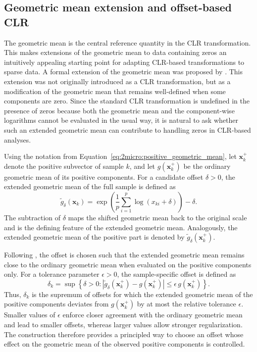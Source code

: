 \subsection{Geometric mean extension and offset-based CLR}
\label{sec:2micro:clr_with_zeros:gmeCLR}

The geometric mean is the central reference quantity in the CLR transformation. This makes extensions of the geometric mean to data containing zeros an intuitively appealing starting point for adapting CLR-based transformations to sparse data. A formal extension of the geometric mean was proposed by \citet{delacruz2019geometric}. This extension was not originally introduced as a CLR transformation, but as a modification of the geometric mean that remains well-defined when some components are zero. Since the standard CLR transformation is undefined in the presence of zeros because both the geometric mean and the component-wise logarithms cannot be evaluated in the usual way, it is natural to ask whether such an extended geometric mean can contribute to handling zeros in CLR-based analyses.

Using the notation from Equation~\eqref{eq:2micro:positive_geometric_mean}, let $\mathbf{x}_k^+$ denote the positive subvector of sample $k$, and let $g(\mathbf{x}_k^+)$ be the ordinary geometric mean of its positive components. For a candidate offset $\delta>0$, the extended geometric mean of the full sample is defined as
\begin{equation}
\tilde{g}_{\delta}(\mathbf{x}_k)=\exp\left(\frac{1}{p}\sum_{i=1}^p\log(x_{ki}+\delta)\right)-\delta.
\label{eq:2micro:extended_geometric_mean}
\end{equation}
The subtraction of $\delta$ maps the shifted geometric mean back to the original scale and is the defining feature of the extended geometric mean. Analogously, the extended geometric mean of the positive part is denoted by $\tilde{g}_{\delta}(\mathbf{x}_k^+)$.

Following \citet{delacruz2019geometric}, the offset is chosen such that the extended geometric mean remains close to the ordinary geometric mean when evaluated on the positive components only. For a tolerance parameter $\epsilon>0$, the sample-specific offset is defined as
\begin{equation}
\delta_k=\sup\left\{\delta>0:\left|\tilde{g}_{\delta}(\mathbf{x}_k^+)-g(\mathbf{x}_k^+)\right|\leq \epsilon\, g(\mathbf{x}_k^+)\right\}.
\label{eq:2micro:extended_geometric_mean_delta}
\end{equation}
Thus, $\delta_k$ is the supremum of offsets for which the extended geometric mean of the positive components deviates from $g(\mathbf{x}_k^+)$ by at most the relative tolerance $\epsilon$. Smaller values of $\epsilon$ enforce closer agreement with the ordinary geometric mean and lead to smaller offsets, whereas larger values allow stronger regularization. The construction therefore provides a principled way to choose an offset whose effect on the geometric mean of the observed positive components is controlled.

